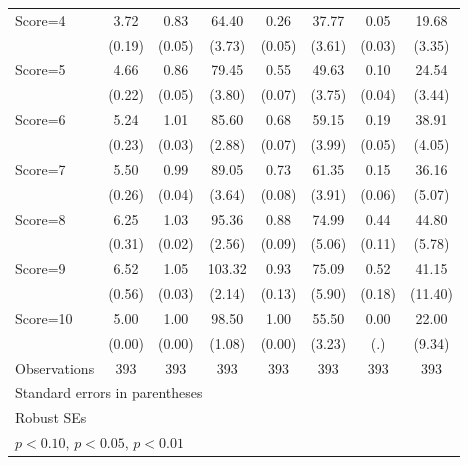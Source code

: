 \begin{table}[htbp]
\begin{tabular}{l*{7}{c}}
Score=4         &     3.72\sym{***}&     0.83\sym{***}&    64.40\sym{***}&     0.26\sym{***}&    37.77\sym{***}&     0.05\sym{*}  &    19.68\sym{***}\\
                &   (0.19)         &   (0.05)         &   (3.73)         &   (0.05)         &   (3.61)         &   (0.03)         &   (3.35)         \\
Score=5         &     4.66\sym{***}&     0.86\sym{***}&    79.45\sym{***}&     0.55\sym{***}&    49.63\sym{***}&     0.10\sym{***}&    24.54\sym{***}\\
                &   (0.22)         &   (0.05)         &   (3.80)         &   (0.07)         &   (3.75)         &   (0.04)         &   (3.44)         \\
Score=6         &     5.24\sym{***}&     1.01\sym{***}&    85.60\sym{***}&     0.68\sym{***}&    59.15\sym{***}&     0.19\sym{***}&    38.91\sym{***}\\
                &   (0.23)         &   (0.03)         &   (2.88)         &   (0.07)         &   (3.99)         &   (0.05)         &   (4.05)         \\
Score=7         &     5.50\sym{***}&     0.99\sym{***}&    89.05\sym{***}&     0.73\sym{***}&    61.35\sym{***}&     0.15\sym{***}&    36.16\sym{***}\\
                &   (0.26)         &   (0.04)         &   (3.64)         &   (0.08)         &   (3.91)         &   (0.06)         &   (5.07)         \\
Score=8         &     6.25\sym{***}&     1.03\sym{***}&    95.36\sym{***}&     0.88\sym{***}&    74.99\sym{***}&     0.44\sym{***}&    44.80\sym{***}\\
                &   (0.31)         &   (0.02)         &   (2.56)         &   (0.09)         &   (5.06)         &   (0.11)         &   (5.78)         \\
Score=9         &     6.52\sym{***}&     1.05\sym{***}&   103.32\sym{***}&     0.93\sym{***}&    75.09\sym{***}&     0.52\sym{***}&    41.15\sym{***}\\
                &   (0.56)         &   (0.03)         &   (2.14)         &   (0.13)         &   (5.90)         &   (0.18)         &  (11.40)         \\
Score=10        &     5.00\sym{***}&     1.00\sym{***}&    98.50\sym{***}&     1.00\sym{***}&    55.50\sym{***}&     0.00         &    22.00\sym{**} \\
                &   (0.00)         &   (0.00)         &   (1.08)         &   (0.00)         &   (3.23)         &      (.)         &   (9.34)         \\
\hline
Observations    &      393         &      393         &      393         &      393         &      393         &      393         &      393         \\
\hline\hline
\multicolumn{8}{l}{\footnotesize Standard errors in parentheses}\\
\multicolumn{8}{l}{\footnotesize Robust SEs}\\
\multicolumn{8}{l}{\footnotesize \sym{*} \(p<0.10\), \sym{**} \(p<0.05\), \sym{***} \(p<0.01\)}\\
\end{tabular}
\end{table}
